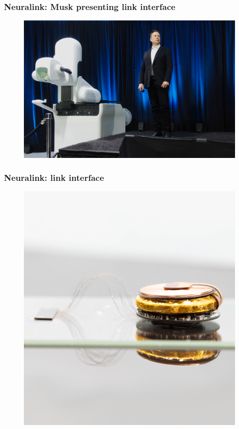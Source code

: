 \documentclass[12pt, aspectratio=169]{beamer}
\begin{document}
\begin{frame}
  \frametitle{Neuralink: Musk presenting link interface}
  \begin{figure}
    \includegraphics[width=0.6\linewidth]{Elon_Musk_and_the_Neuralink_Future}
  \end{figure}
\end{frame}


\begin{frame}
  \frametitle{Neuralink: link interface}
  \begin{figure}
    \includegraphics[width=0.4\linewidth]{approach-link-1}
  \end{figure}
\end{frame}




\end{document}
